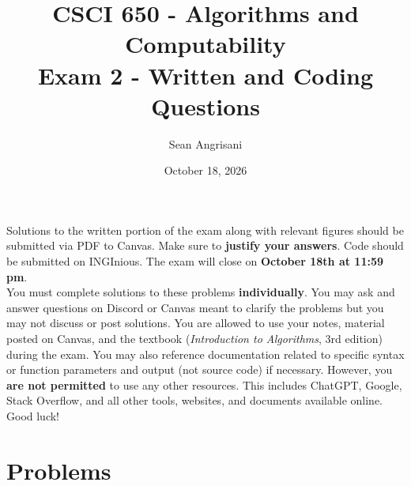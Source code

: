 \documentclass{article}
\title{CSCI 650 - Algorithms and Computability \\ Exam 2 - Written and Coding Questions}
\author{Sean Angrisani}
\date{October 18, 2026}
\begin{document}
\maketitle
\vspace{-1.5\baselineskip}


\noindent Solutions to the written portion of the exam along with relevant figures should be submitted via PDF to Canvas. Make sure to \textbf{justify your answers}. Code should be submitted on INGInious. The exam will close on \textbf{October 18th at 11:59 pm}. \\ 

\noindent You must complete solutions to these problems \textbf{individually}. You may ask and answer questions on Discord or Canvas meant to clarify the problems but you may not discuss or post solutions. You are allowed to use your notes, material posted on Canvas, and the textbook (\textit{Introduction to Algorithms}, 3rd edition) during the exam. You may also reference documentation related to specific syntax or function parameters and output (not source code) if necessary. However, you \textbf{are not permitted} to use any other resources. This includes ChatGPT, Google, Stack Overflow, and all other tools, websites, and documents available online. \\

\noindent Good luck!\\

\section*{Problems}
\end{document}
